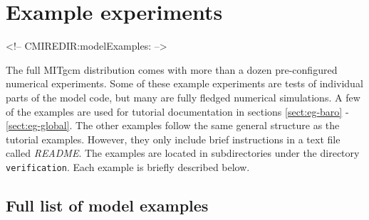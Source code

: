 \section[MITgcm Example Experiments]{Example experiments}
\label{sect:modelExamples}
\begin{rawhtml}
<!-- CMIREDIR:modelExamples: -->
\end{rawhtml}


The full MITgcm distribution comes with more than a dozen
pre-configured numerical experiments. Some of these example
experiments are tests of individual parts of the model code, but many
are fully fledged numerical simulations. A few of the examples are
used for tutorial documentation in sections \ref{sect:eg-baro} -
\ref{sect:eg-global}.  The other examples follow the same general
structure as the tutorial examples. However, they only include brief
instructions in a text file called {\it README}.  The examples are
located in subdirectories under the directory \texttt{verification}.
Each example is briefly described below.

\subsection{Full list of model examples}

